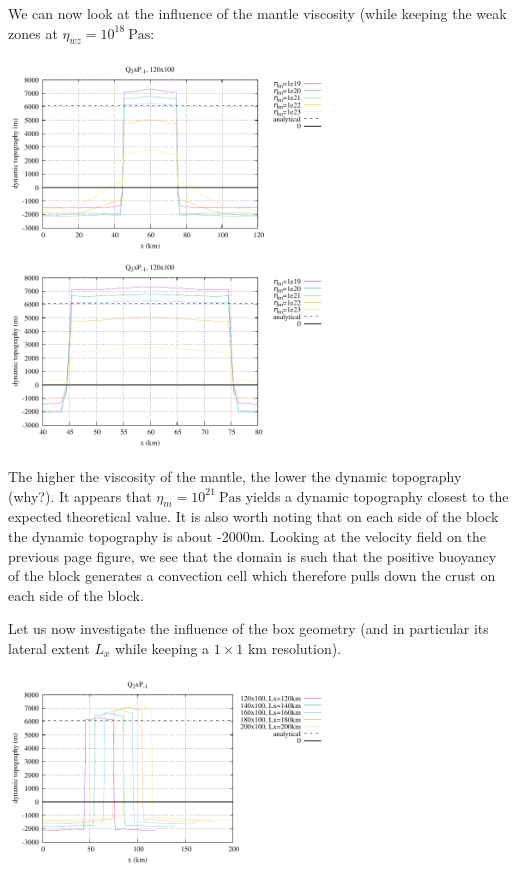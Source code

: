 We can now look at the influence of the mantle viscosity (while keeping the 
weak zones at $\eta_{wz}=10^{18}~\si{\pascal\second}$:
\begin{center}
\includegraphics[width=8.5cm]{python_codes/fieldstone_160/results/dyn_topo4a.pdf}
\includegraphics[width=8.5cm]{python_codes/fieldstone_160/results/dyn_topo4b.pdf}
\end{center}
The higher the viscosity of the mantle, the lower the dynamic topography (why?). 
It appears that $\eta_m=10^{21}~\si{\pascal\second}$ yields a dynamic topography
closest to the expected theoretical value.
It is also worth noting that on each side of the block the dynamic topography
is about -2000m.
Looking at the velocity field on the previous page figure, we see that the domain
is such that the positive buoyancy of the block generates a convection cell which 
therefore pulls down the crust on each side of the block.

Let us now investigate the influence of the box geometry (and in particular its 
lateral extent $L_x$ while keeping a $1\times 1$ km resolution).
\begin{center}
\includegraphics[width=8.5cm]{python_codes/fieldstone_160/results/dyn_topo5.pdf}
\end{center}

